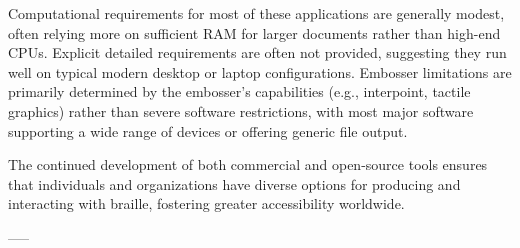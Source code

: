 Computational requirements for most of these applications are generally modest, often relying more on sufficient RAM for larger documents rather than high-end CPUs. Explicit detailed requirements are often not provided, suggesting they run well on typical modern desktop or laptop configurations. Embosser limitations are primarily determined by the embosser's capabilities (e.g., interpoint, tactile graphics) rather than severe software restrictions, with most major software supporting a wide range of devices or offering generic file output.

The continued development of both commercial and open-source tools ensures that individuals and organizations have diverse options for producing and interacting with braille, fostering greater accessibility worldwide.

-----

